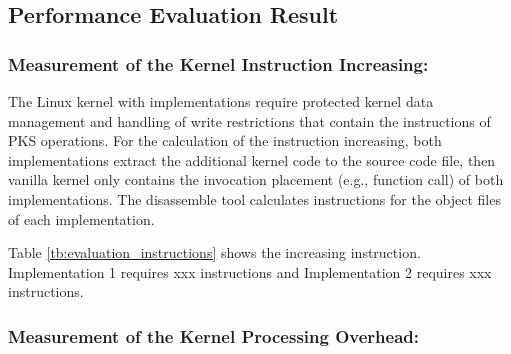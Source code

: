 

\subsection{Performance Evaluation Result}
\subsubsection{Measurement of the Kernel Instruction Increasing:}
The Linux kernel with implementations require protected kernel data management
and handling of write restrictions that contain the instructions of PKS
operations.
%
%
For the calculation of the instruction increasing, both implementations extract
the additional kernel code to the source code file, then vanilla kernel only
contains the invocation placement (e.g., function call) of both implementations.
The disassemble tool calculates instructions for the object files of each
implementation.

Table \ref{tb:evaluation_instructions} shows the increasing instruction.
Implementation 1 requires xxx instructions and Implementation 2 requires xxx
instructions.
%

\subsubsection{Measurement of the Kernel Processing Overhead:}

